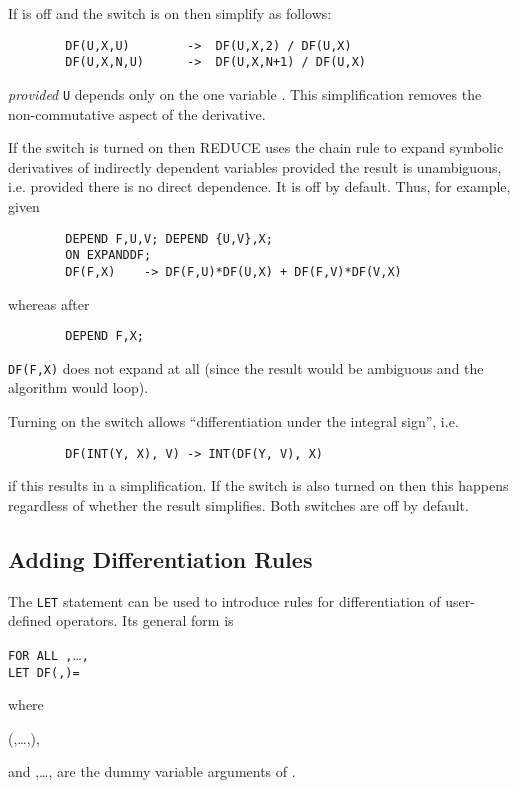 If  is off and the switch 
is on then simplify as follows:
\begin{verbatim}
        DF(U,X,U)        ->  DF(U,X,2) / DF(U,X)
        DF(U,X,N,U)      ->  DF(U,X,N+1) / DF(U,X)
\end{verbatim}
\emph{provided} \texttt{U} depends only on the one variable .
This simplification removes the non-commutative aspect of the derivative.

\hypertarget{switch:EXPANDDF}{}
If the switch  is turned on then REDUCE uses
the chain rule to expand symbolic derivatives of indirectly dependent variables
provided the result is unambiguous, i.e. provided there is no direct dependence.
It is off by default.  Thus, for example, given
\newpage
\begin{verbatim}
        DEPEND F,U,V; DEPEND {U,V},X;
        ON EXPANDDF;
        DF(F,X)    -> DF(F,U)*DF(U,X) + DF(F,V)*DF(V,X)
\end{verbatim}
whereas after
\begin{verbatim}
        DEPEND F,X;
\end{verbatim}
\texttt{DF(F,X)} does not expand at all (since the result would be ambiguous
and the algorithm would loop).

\hypertarget{switch:ALLOWDFINT}{}
\hypertarget{switch:DFINT}{}
Turning on the switch  allows
``differentiation under the integral sign'', i.e. 
\begin{verbatim}
        DF(INT(Y, X), V) -> INT(DF(Y, V), X)
\end{verbatim}
if this results in a simplification.  If the switch 
is also turned on then this happens regardless of whether the result
simplifies. Both switches are off by default.


\subsection{Adding Differentiation Rules}
\hypertarget{command:LETdf}{}

The \texttt{LET} statement can be used to introduce
rules for differentiation of user-defined operators.  Its general form is
\begin{syntaxtable}
 \texttt{FOR ALL }\texttt{,}\dots\texttt{,} \\
  \qquad \texttt{LET DF(}\texttt{,}\texttt{)=}
\end{syntaxtable}
where 
\begin{syntax}
  \bnfprod  (,\dots,),
\end{syntax}
and
,\ldots, are the dummy variable arguments of
.


